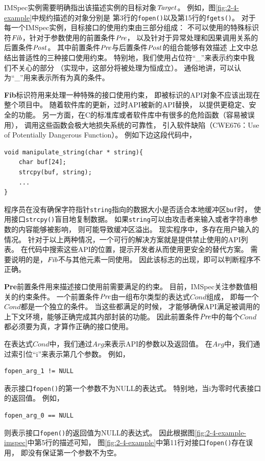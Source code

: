 
IMSpec实例需要明确指出该描述实例的目标对象$\mathit{Target}$。
例如，图\ref{fig:2-4-example}中规约描述的对象分别是
第3行的\texttt{fopen()}以及第15行的\texttt{fgets()}。
对于每一个IMSpec实例，目标接口的使用约束由三部分组成：
不可以使用的特殊标识符$\mathit{Fib}$，针对于参数使用的前置条件$\mathit{Pre}$，
以及针对于异常处理和因果调用关系的后置条件$\mathit{Post}$。
其中前置条件$\mathit{Pre}$与后置条件$\mathit{Post}$的组合能够有效描述
上文中总结出普适性的三种接口使用约束。
特别地，我们使用占位符“\_”来表示约束中我们不关心的部分
（实现中，这部分将被处理为恒成立）。
通俗地讲，可以认为“\_”用来表示所有为真的条件。

\textbf{Fib}标识符用来处理一种特殊的接口使用约束，
即被标识的API对象不应该出现在整个项目中。
随着软件库的更新，过时API被新的API替换，
以提供更稳定、安全的功能。
另一方面，在C的标准库或者软件库中有很多的危险函数（容易被误用），
调用这些函数会极大地损失系统的可靠性，
引入软件缺陷（CWE676：Use of Potentially Dangerous Function）。
例如下边这段代码中，
\begin{lstlisting}[language={[ANSI]C},
basicstyle=\linespread{0.8}\listingsfont,
numbers=none,
xleftmargin=.3\textwidth]
void manipulate_string(char * string){
	char buf[24];
	strcpy(buf, string);
	...
}
\end{lstlisting}
程序员在没有确保字符指针\texttt{string}指向的数据大小是否适合本地缓冲区\texttt{buf}时，
使用接口\texttt{strcpy()}盲目地复制数据。
如果\texttt{string}可以由攻击者来输入或者字符串参数的内容能够被影响，
则可能导致缓冲区溢出。
现实程序中，多存在用户输入的情况。
针对于以上两种情况，一个可行的解决方案就是提供禁止使用的API列表。
在代码中搜索这些API的位置，提示开发者从而使用更安全的替代方案。
需要说明的是，$\mathit{Fib}$不与其他元素一同使用。
因此该标志的出现，即可以判断程序不正确。


\textbf{Pre}前置条件用来描述接口使用前需要满足的约束。
目前，IMSpec关注参数值相关的约束条件。
一个前置条件$\mathit{Pre}$由一组布尔类型的表达式$\mathit{Cond}$组成，
即每一个$\mathit{Cond}$都是一个独立的条件。
当这些都满足的时候，
才能够确保API满足被调用的上下文环境，能够正确完成其内部封装的功能。
因此前置条件$\mathit{Pre}$中的每个$\mathit{Cond}$都必须要为真，才算作正确的接口使用。

在表达式$\mathit{Cond}$中，我们通过$\mathit{Arg}$来表示API的参数以及返回值。
在$\mathit{Arg}$中，我们通过索引位“i”来表示第几个参数。
例如，
\begin{lstlisting}[language={[ANSI]C},
basicstyle=\linespread{0.8}\listingsfont,
numbers=none,
xleftmargin=.3\textwidth]
fopen_arg_1 != NULL
\end{lstlisting}
表示接口\texttt{fopen()}的第一个参数不为NULL的表达式。
特别地，当i为零时代表接口的返回值。
例如，
\begin{lstlisting}[language={[ANSI]C},
basicstyle=\linespread{0.8}\listingsfont,
numbers=none,
xleftmargin=.3\textwidth,]
fopen_arg_0 == NULL
\end{lstlisting}
则表示接口\texttt{fopen()}的返回值为NULL的表达式。
因此根据图\ref{fig:2-4-example-imspec}中第5行的描述可知，
图\ref{fig:2-4-example}中第11行对接口\texttt{fopen()}存在误用，
即没有保证第一个参数不为空。



